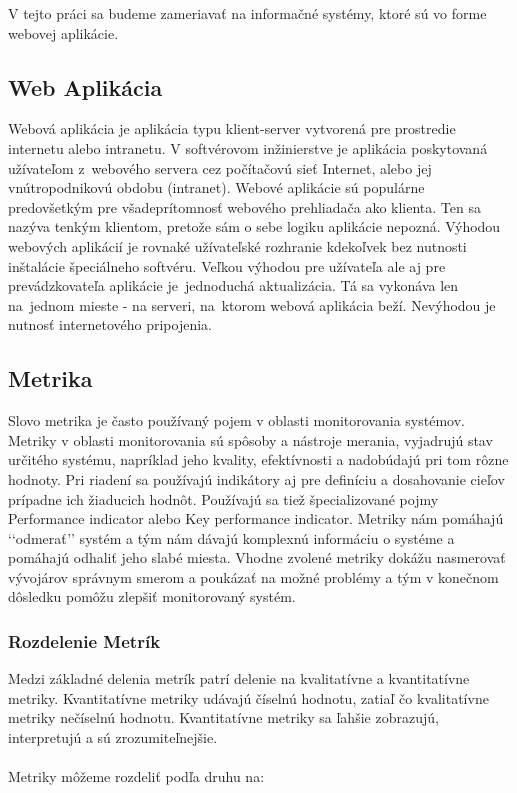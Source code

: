 \documentclass[a4paper, usesections, upjsfrontpage, thesismargins, thesislinespacing]{rnthesis}
\begin{document}
V tejto práci sa budeme zameriavať na informačné systémy, ktoré sú vo forme webovej aplikácie.


\subsection{Web Aplikácia}

Webová aplikácia je aplikácia typu klient-server vytvorená pre prostredie internetu alebo intranetu.
V softvérovom inžinierstve je aplikácia poskytovaná užívateľom z~webového servera cez počítačovú sieť Internet, 
alebo jej vnútropodni\-kovú obdobu (intranet). 
Webové aplikácie sú populárne predovšetkým pre všade\-prítomnosť webového prehliadača ako klienta. 
Ten sa nazýva tenkým klientom, pretože sám o sebe logiku aplikácie nepozná.
Výhodou webových aplikácií je rovnaké užívateľské rozhranie kdekoľvek bez nutnosti inštalácie špeciálneho softvéru. 
Veľkou výhodou pre užívateľa ale aj pre prevádzkovateľa aplikácie je~jednoduchá aktualizácia. 
Tá sa vykonáva len na~jednom mieste - na serveri, na~ktorom webová aplikácia beží. Nevýhodou je nutnosť internetového pripojenia.

\subsection{Metrika}
Slovo metrika je často používaný pojem v oblasti monitorovania systémov.
Metri\-ky v oblasti monitorovania sú spôsoby a nástroje merania, vyjadrujú stav určitého systému, 
napríklad jeho kvality, efektívnosti a nadobúdajú pri tom rôzne hodnoty. 
Pri riadení sa používajú indikátory aj pre definíciu a dosahovanie cieľov prípadne ich žiaducich hodnôt. 
Používajú sa tiež špecializované pojmy Performance indicator alebo Key performance indicator.
Metriky nám pomáhajú ‘‘odmerať’’ systém a tým nám dávajú komplexnú informáciu o systéme a pomáhajú odhaliť jeho slabé miesta.
Vhodne zvolené metriky dokážu nasmerovať vývojárov správnym smerom a poukázať na možné problémy a tým v konečnom dôsledku pomôžu zlepšiť monitorovaný systém.

\subsubsection{Rozdelenie Metrík}


Medzi základné delenia metrík patrí delenie na kvalitatívne a kvantitatívne metriky.
Kvantitatívne metriky udávajú číselnú hodnotu, zatiaľ čo kvalitatívne metriky nečíselnú hodnotu.  
Kvantitatívne metriky sa ľahšie zobrazujú, interpretujú a sú zrozumiteľnejšie.
~\\
~\\
Metriky môžeme rozdeliť podľa druhu na:
\end{document}
